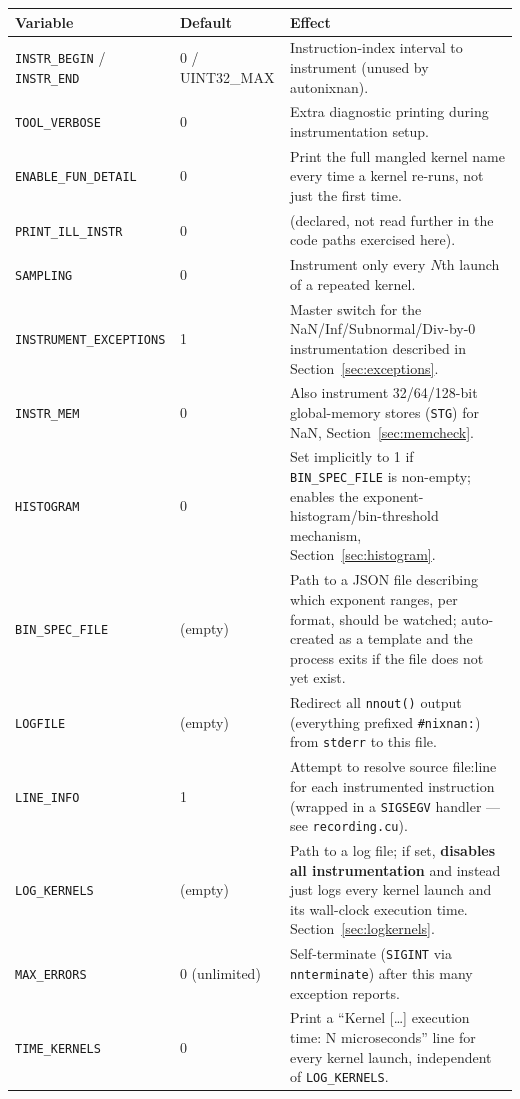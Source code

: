 \documentclass[11pt]{article}
\begin{document}
\begin{longtable}{p{3.2cm}p{2.3cm}p{8.2cm}}
\toprule
\textbf{Variable} & \textbf{Default} & \textbf{Effect} \\
\midrule
\endhead
\texttt{INSTR\_BEGIN} / \texttt{INSTR\_END} & 0 / UINT32\_MAX & Instruction-index interval to instrument (unused by autonixnan). \\
\texttt{TOOL\_VERBOSE} & 0 & Extra diagnostic printing during instrumentation setup. \\
\texttt{ENABLE\_FUN\_DETAIL} & 0 & Print the full mangled kernel name every time a kernel re-runs, not just the first time. \\
\texttt{PRINT\_ILL\_INSTR} & 0 & (declared, not read further in the code paths exercised here). \\
\texttt{SAMPLING} & 0 & Instrument only every $N$th launch of a repeated kernel. \\
\texttt{INSTRUMENT\_EXCEPTIONS} & 1 & Master switch for the NaN/Inf/Subnormal/Div-by-0 instrumentation described in Section~\ref{sec:exceptions}. \\
\texttt{INSTR\_MEM} & 0 & Also instrument 32/64/128-bit global-memory stores (\texttt{STG}) for NaN, Section~\ref{sec:memcheck}. \\
\texttt{HISTOGRAM} & 0 & Set implicitly to 1 if \texttt{BIN\_SPEC\_FILE} is non-empty; enables the exponent-histogram/bin-threshold mechanism, Section~\ref{sec:histogram}. \\
\texttt{BIN\_SPEC\_FILE} & (empty) & Path to a JSON file describing which exponent ranges, per format, should be watched; auto-created as a template and the process exits if the file does not yet exist. \\
\texttt{LOGFILE} & (empty) & Redirect all \texttt{nnout()} output (everything prefixed \texttt{\#nixnan:}) from \texttt{stderr} to this file. \\
\texttt{LINE\_INFO} & 1 & Attempt to resolve source file:line for each instrumented instruction (wrapped in a \texttt{SIGSEGV} handler --- see \texttt{recording.cu}). \\
\texttt{LOG\_KERNELS} & (empty) & Path to a log file; if set, \textbf{disables all instrumentation} and instead just logs every kernel launch and its wall-clock execution time. Section~\ref{sec:logkernels}. \\
\texttt{MAX\_ERRORS} & 0 (unlimited) & Self-terminate (\texttt{SIGINT} via \texttt{nnterminate}) after this many exception reports. \\
\texttt{TIME\_KERNELS} & 0 & Print a ``Kernel [\ldots] execution time: N microseconds'' line for every kernel launch, independent of \texttt{LOG\_KERNELS}. \\

\end{longtable}
\end{document}
